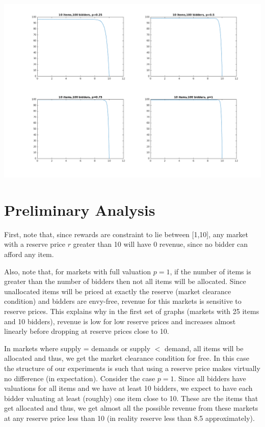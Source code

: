 \documentclass[letterpaper,12pt]{article}
\theoremstyle{plain}
\theoremstyle{definition}
\theoremstyle{remark}
\begin{document}
\hspace*{-0.75in}\includegraphics[width=38em]{../unit-demand/unitdemand-10-100.png}

\section{Preliminary Analysis}

First, note that, since rewards are constraint to lie between [1,10], any market with a reserve price $r$ greater than 10 will have 0 revenue, since 
no bidder can afford any item. 

Also, note that, for markets with full valuation $p=1$, if the number of items is greater than the number of bidders then not all items will be allocated.
Since unallocated items will be priced at exactly the reserve (market clearance condition) and bidders are envy-free, revenue for this markets is sensitive to reserve prices. 
This explains why in the first set of graphs (markets with 25 items and  10 bidders), revenue is low for low reserve prices and increases almost linearly 
before dropping at reserve prices close to 10. 

In markets where supply = demands or supply $<$ demand, all items will be allocated and thus, we get the market clearance condition for free.
In this case the structure of our experiments is such that using a reserve price makes virtually no difference (in expectation).
Consider the case $p=1$. Since all bidders have valuations for all items and we have at least 10 bidders, we expect to have each bidder valuating 
at least (roughly) one item close to 10. These are the items that get allocated and thus, we get almost all the possible revenue from these markets
at any reserve price less than 10 (in reality reserve less than 8.5 approximately).

%
%
\end{document}
